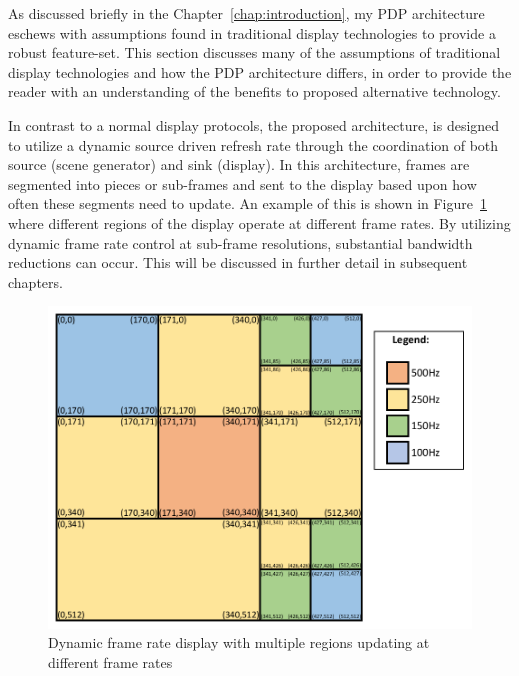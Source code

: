     As discussed briefly in the Chapter~\ref{chap:introduction}, my PDP architecture eschews with assumptions found in traditional display technologies to provide a robust feature-set. This section discusses many of the assumptions of traditional display technologies and how the PDP architecture differs, in order to provide the reader with an understanding of the benefits to proposed alternative technology.

    In contrast to a normal display protocols, the proposed architecture, is designed to utilize a dynamic source driven refresh rate through the coordination of both source (scene generator) and sink (display). In this architecture, frames are segmented into pieces or sub-frames and sent to the display based upon how often these segments need to update. An example of this is shown in Figure~\ref{fig:variable_display} where different regions of the display operate at different frame rates. By utilizing dynamic frame rate control at sub-frame resolutions, substantial bandwidth reductions can occur. This will be discussed in further detail in subsequent chapters.

    \begin{figure}
        \centering
        \includegraphics[width=1.0\textwidth]{fig/variable_display.pdf}
        \caption{Dynamic frame rate display with multiple regions updating at different frame rates}
        \label{fig:variable_display}
    \end{figure}

